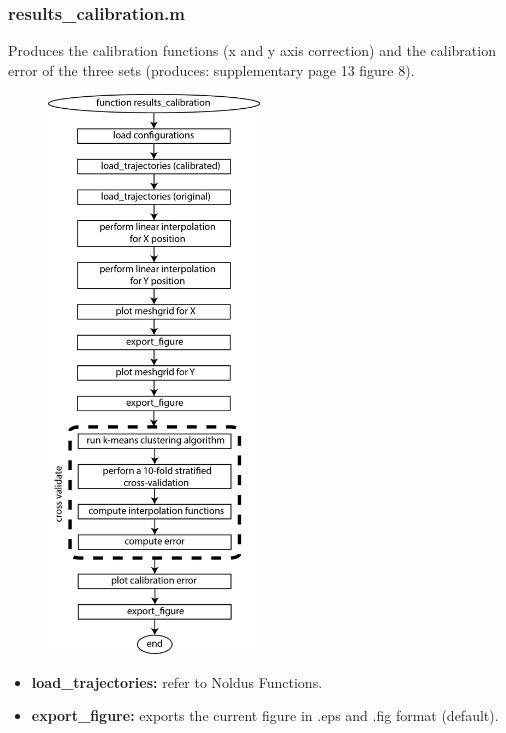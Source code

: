 \documentclass[12pt,titlepage]{article}
\begin{document}
\begin{doublespace}
\subsubsection{results\_calibration.m}
Produces the calibration functions (x and y axis correction) and the calibration error of the three sets (produces: supplementary page 13 figure 8).

\begin{figure}[H]
	\begin{center}
		\includegraphics[width=0.5\textwidth]{results_calibration.jpg}
		\label{sfig8-10}
	\end{center}
\end{figure}

\begin{itemize}
	\item\textbf{load\_trajectories:} refer to Noldus Functions.
	\item\textbf{export\_figure:} exports the current figure in .eps and .fig format (default).
\end{itemize}	


\end{doublespace}
\end{document}
